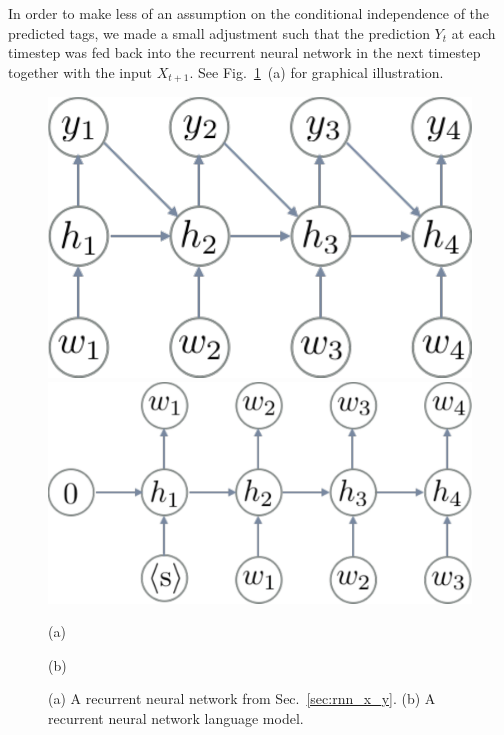 \documentclass{report}
\begin{document}
In order to make less of an assumption on the conditional independence of the
predicted tags, we made a small adjustment such that the prediction $Y_{t}$ at
each timestep was fed back into the recurrent neural network in the next
timestep together with the input $X_{t+1}$. See Fig.~\ref{fig:rnn_lm}~(a) for
graphical illustration.

\begin{figure}[t]
    \centering
    \begin{minipage}{0.44\textwidth}
        \centering
        \includegraphics[width=0.95\columnwidth]{figures/rnn_same_length.pdf}
    \end{minipage}
    \hfill
    \begin{minipage}{0.55\textwidth}
        \centering
        \includegraphics[width=0.95\columnwidth]{figures/rnn_lm.pdf}
    \end{minipage}

    \begin{minipage}{0.44\textwidth}
        \centering
        (a)
    \end{minipage}
    \hfill
    \begin{minipage}{0.55\textwidth}
        \centering
        (b)
    \end{minipage}

    \caption{
        (a) A recurrent neural network from Sec.~\ref{sec:rnn_x_y}. (b) A
        recurrent neural network language model.
    }
    \label{fig:rnn_lm}
\end{figure}
\end{document}
